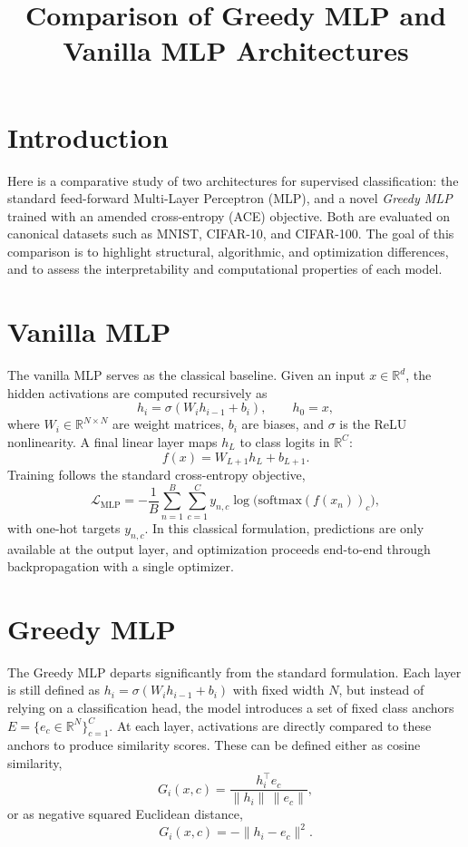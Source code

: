 \documentclass[11pt]{article}
\title{Comparison of Greedy MLP and Vanilla MLP Architectures}
\author{}
\date{}
\begin{document}
\maketitle

\section{Introduction}
Here is a comparative study of two architectures for supervised classification: the standard feed-forward Multi-Layer Perceptron (MLP), and a novel \emph{Greedy MLP} trained with an amended cross-entropy (ACE) objective. Both are evaluated on canonical datasets such as MNIST, CIFAR-10, and CIFAR-100. The goal of this comparison is to highlight structural, algorithmic, and optimization differences, and to assess the interpretability and computational properties of each model.

\section{Vanilla MLP}
The vanilla MLP serves as the classical baseline. Given an input $x \in \mathbb{R}^d$, the hidden activations are computed recursively as
\[
  h_i = \sigma(W_i h_{i-1} + b_i), \qquad h_0 = x,
\]
where $W_i \in \mathbb{R}^{N \times N}$ are weight matrices, $b_i$ are biases, and $\sigma$ is the ReLU nonlinearity. A final linear layer maps $h_L$ to class logits in $\mathbb{R}^C$:
\[
  f(x) = W_{L+1} h_L + b_{L+1}.
\]
Training follows the standard cross-entropy objective,
\[
  \mathcal{L}_{\text{MLP}} = - \frac{1}{B} \sum_{n=1}^B \sum_{c=1}^C y_{n,c} \log \big( \mathrm{softmax}(f(x_n))_c \big),
\]
with one-hot targets $y_{n,c}$. In this classical formulation, predictions are only available at the output layer, and optimization proceeds end-to-end through backpropagation with a single optimizer.

\section{Greedy MLP}
The Greedy MLP departs significantly from the standard formulation. Each layer is still defined as $h_i = \sigma(W_i h_{i-1} + b_i)$ with fixed width $N$, but instead of relying on a classification head, the model introduces a set of fixed class anchors $E = \{e_c \in \mathbb{R}^N\}_{c=1}^C$. At each layer, activations are directly compared to these anchors to produce similarity scores. These can be defined either as cosine similarity,
\[
  G_i(x,c) = \frac{h_i^\top e_c}{\|h_i\| \, \|e_c\|},
\]
or as negative squared Euclidean distance,
\[
  G_i(x,c) = - \|h_i - e_c\|^2.
\]
\end{document}

